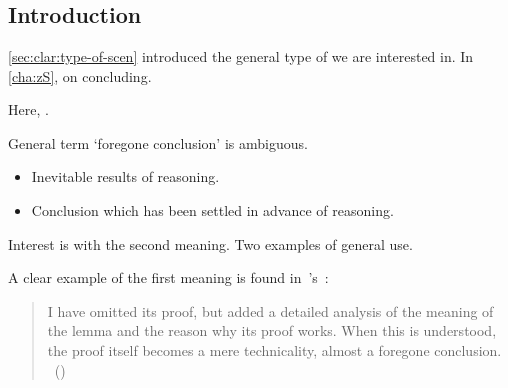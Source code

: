 \chapter{}
\label{cha:fcs}

\section{Introduction}
\label{cha:fcs:sec:introduction}

\begin{note}
  \autoref{sec:clar:type-of-scen} introduced the general type of \scen{} we are interested in.
  In \autoref{cha:zS},  on concluding.

  Here, .

  General term `foregone conclusion' is ambiguous.
  \begin{itemize}
    \item
    Inevitable results of reasoning.
  \item
    Conclusion which has been settled in advance of reasoning.
  \end{itemize}

  Interest is with the second meaning.
  Two examples of general use.

  A clear example of the first meaning is found in~\citeauthor{Machover:1996vu}'s~:

  \begin{quote}
    I have omitted its proof, but added a detailed analysis of the meaning of the lemma and the reason why its proof works. When this is understood, the proof itself becomes a mere technicality, almost a foregone conclusion.%
    \mbox{ }\hfill\mbox{(\citeyear[viii]{Machover:1996vu})}
  \end{quote}


\end{note}
